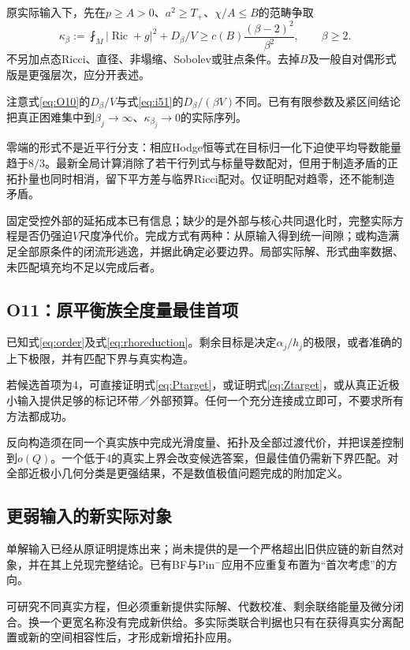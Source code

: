 \documentclass[UTF8,fontset=fandol,zihao=-4,a4paper]{ctexart}
\theoremstyle{remark}
\DeclareMathOperator{\Ric}{Ric}
\newcommand{\avg}{\mathop{\fint}}
\begin{document}
原实际输入下，先在$p\ge A>0$、$a^2\ge T_+$、$\chi/A\le B$的范畴争取
\begin{equation}
\boxed{\kappa_\beta:=\avg_M|\Ric+g|^2+D_\beta/V
\ge c(B)\frac{(\beta-2)^2}{\beta^2},\qquad\beta\ge2.}
\label{eq:O10}
\end{equation}
不另加点态Ricci、直径、非塌缩、Sobolev或驻点条件。去掉$B$及一般自对偶形式版是更强层次，应分开表述。

注意式\eqref{eq:O10}的$D_\beta/V$与式\eqref{eq:i51}的$D_\beta/(\beta V)$不同。已有有限参数及紧区间结论把真正困难集中到$\beta_j\to\infty$、$\kappa_{\beta_j}\to0$的实际序列。

零端的形式不是近平行分支：相应Hodge恒等式在目标归一化下迫使平均导数能量趋于$8/3$。最新全局计算消除了若干行列式与标量导数配对，但用于制造矛盾的正拓扑量也同时相消，留下平方差与临界Ricci配对。仅证明配对趋零，还不能制造矛盾。

固定受控外部的延拓成本已有信息；缺少的是外部与核心共同退化时，完整实际方程是否仍强迫$V$尺度净代价。完成方式有两种：从原输入得到统一间隙；或构造满足全部原条件的闭流形逃逸，并据此确定必要边界。局部实际解、形式曲率数据、未匹配填充均不足以完成后者。

\subsection{O11：原平衡族全度量最佳首项}

已知式\eqref{eq:order}及式\eqref{eq:rhoreduction}。剩余目标是决定$\alpha_j/h_j$的极限，或者准确的上下极限，并有匹配下界与真实构造。

若候选首项为4，可直接证明式\eqref{eq:Ptarget}，或证明式\eqref{eq:Ztarget}，或从真正近极小输入提供足够的标记环带／外部预算。任何一个充分连接成立即可，不要求所有方法都成功。

反向构造须在同一个真实族中完成光滑度量、拓扑及全部过渡代价，并把误差控制到$o(Q)$。一个低于4的真实上界会改变候选答案，但最佳值仍需新下界匹配。对全部近极小几何分类是更强结果，不是数值极值问题完成的附加定义。

\subsection{更弱输入的新实际对象}

单解输入已经从原证明提炼出来；尚未提供的是一个严格超出旧供应链的新自然对象，并在其上兑现完整结论。已有BF与Pin$^-$应用不应重复布置为“首次考虑”的方向。

可研究不同真实方程，但必须重新提供实际解、代数校准、剩余联络能量及微分闭合。换一个更宽名称没有完成新供给。多实际类联合判据也只有在获得真实分离配置或新的空间相容性后，才形成新增拓扑应用。
\end{document}
